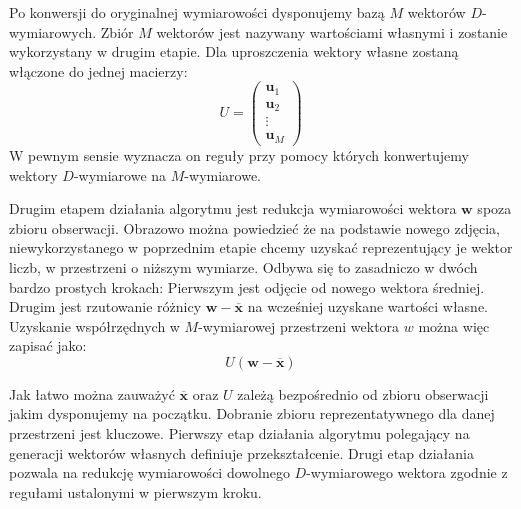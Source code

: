 \documentclass[oneside, eng]{mgr}
\newcommand{\bb}{\textbf}
\begin{document}
Po konwersji do oryginalnej wymiarowości dysponujemy bazą $M$ wektorów $D$-wymiarowych. Zbiór $M$ wektorów jest nazywany wartościami własnymi i zostanie wykorzystany w drugim etapie. Dla uproszczenia wektory własne zostaną włączone do jednej macierzy:
\begin{equation}
	U = 
	\left( \begin{array}{l}
		\bb{u}_1 \\
		\bb{u}_2 \\
		\vdots	 \\
		\bb{u}_M
	\end{array} \right)
\end{equation}
W pewnym sensie wyznacza on reguły przy pomocy których konwertujemy wektory $D$-wymiarowe na $M$-wymiarowe.

Drugim etapem działania algorytmu jest redukcja wymiarowości wektora $\bb{w}$ spoza zbioru obserwacji. Obrazowo można powiedzieć że na podstawie nowego zdjęcia, niewykorzystanego w poprzednim etapie chcemy uzyskać reprezentujący je wektor liczb, w przestrzeni o niższym wymiarze. Odbywa się to zasadniczo w dwóch bardzo prostych krokach: Pierwszym jest odjęcie od nowego wektora średniej. Drugim jest rzutowanie różnicy $\bb{w} - \overline{\bb{x}}$ na wcześniej uzyskane wartości własne. Uzyskanie współrzędnych w $M$-wymiarowej przestrzeni wektora $w$ można więc zapisać jako:
\begin{equation}
	U ( \bb{w} - \overline{\bb{x}} ) 
\end{equation}

Jak łatwo można zauważyć $\overline{\bb{x}}$ oraz $U$ zależą bezpośrednio od zbioru obserwacji jakim dysponujemy na początku. Dobranie zbioru reprezentatywnego dla danej przestrzeni jest kluczowe. Pierwszy etap działania algorytmu polegający na generacji wektorów własnych definiuje przekształcenie. Drugi etap działania pozwala na redukcję wymiarowości dowolnego $D$-wymiarowego wektora zgodnie z regułami ustalonymi w pierwszym kroku.
\end{document}
